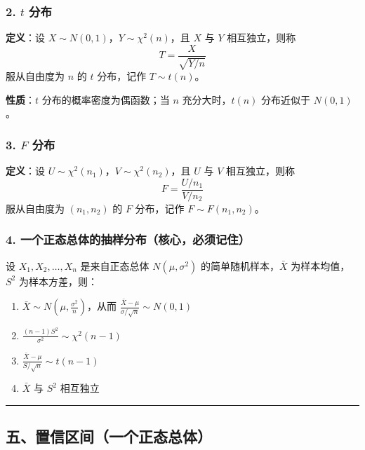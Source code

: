 \documentclass[12pt,a4paper]{ctexart}
\begin{document}
\subsubsection{2. $t$ 分布}
\textbf{定义}：设 $X \sim N(0, 1)$，$Y \sim \chi^2(n)$，且 $X$ 与 $Y$ 相互独立，则称
\[ T = \frac{X}{\sqrt{Y/n}} \]
服从自由度为 $n$ 的 $t$ 分布，记作 $T \sim t(n)$。

\textbf{性质}：$t$ 分布的概率密度为偶函数；当 $n$ 充分大时，$t(n)$ 分布近似于 $N(0, 1)$。

\subsubsection{3. $F$ 分布}
\textbf{定义}：设 $U \sim \chi^2(n_1)$，$V \sim \chi^2(n_2)$，且 $U$ 与 $V$ 相互独立，则称
\[ F = \frac{U/n_1}{V/n_2} \]
服从自由度为 $(n_1, n_2)$ 的 $F$ 分布，记作 $F \sim F(n_1, n_2)$。

\subsubsection{4. 一个正态总体的抽样分布（核心，必须记住）}
设 $X_1, X_2, \dots, X_n$ 是来自正态总体 $N(\mu, \sigma^2)$ 的简单随机样本，$\bar{X}$ 为样本均值，$S^2$ 为样本方差，则：
\begin{enumerate}[noitemsep]
    \item $\bar{X} \sim N(\mu, \frac{\sigma^2}{n})$，从而 $\frac{\bar{X} - \mu}{\sigma/\sqrt{n}} \sim N(0, 1)$
    \item $\frac{(n-1)S^2}{\sigma^2} \sim \chi^2(n-1)$
    \item $\frac{\bar{X} - \mu}{S/\sqrt{n}} \sim t(n-1)$
    \item $\bar{X}$ 与 $S^2$ 相互独立
\end{enumerate}

\vspace{1em}\hrule\vspace{1em}

\subsection{五、置信区间（一个正态总体）}
\end{document}
